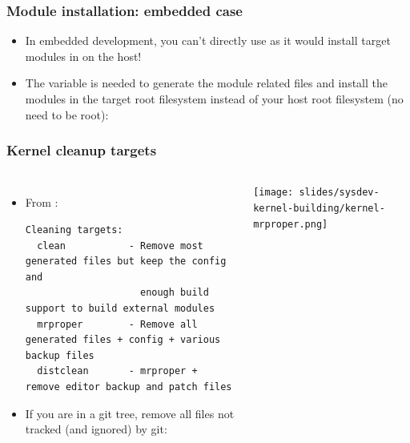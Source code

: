 
\begin{frame}
  \frametitle{Module installation: embedded case}
  \begin{itemize}
  \item In embedded development, you can't directly use
     as it would install target modules
    in  on the host!
  \item The  variable is needed to generate
    the module related files and install the modules in the target
    root filesystem instead of your host root filesystem (no need
    to be root):\\
  \end{itemize}
\end{frame}

\begin{frame}[fragile]
  \frametitle{Kernel cleanup targets}
  \begin{columns}
    \small
    \begin{itemize}
    \item From :
    \begin{block}{}
    \begin{verbatim}
Cleaning targets:
  clean           - Remove most generated files but keep the config and
                    enough build support to build external modules
  mrproper        - Remove all generated files + config + various backup files
  distclean       - mrproper + remove editor backup and patch files
     \end{verbatim}
     \end{block}
    \item If you are in a git tree, remove all files not tracked (and
      ignored) by git:\\
    \end{itemize}
    \texttt{[image: slides/sysdev-kernel-building/kernel-mrproper.png]}
  \end{columns}
\end{frame}

